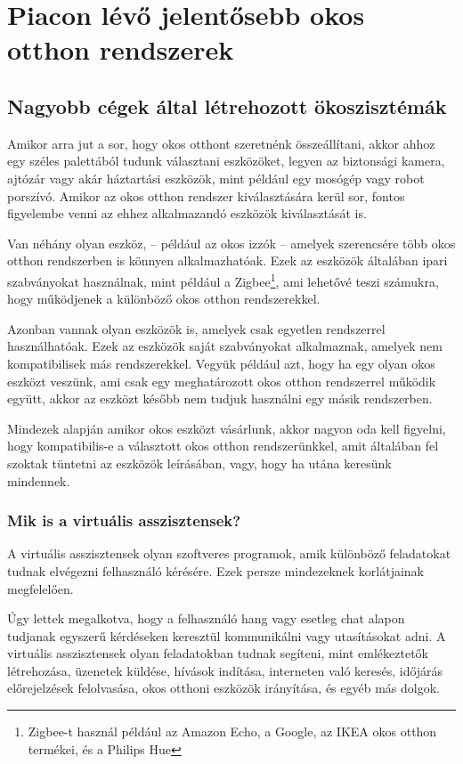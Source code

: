 \documentclass[
]{thesis-ekf}
\theoremstyle{definition}
\theoremstyle{remark}
\begin{document}
	\chapter{Piacon lévő jelentősebb okos otthon rendszerek}
	\section{Nagyobb cégek által létrehozott ökoszisztémák}
	Amikor arra jut a sor, hogy okos otthont szeretnénk összeállítani, akkor ahhoz egy széles palettából tudunk választani eszközöket, legyen az biztonsági kamera, ajtózár vagy akár háztartási eszközök, mint például egy mosógép vagy robot porszívó. Amikor az okos otthon rendszer kiválasztására kerül sor, fontos figyelembe venni az ehhez alkalmazandó eszközök kiválasztását is.
	
	Van néhány olyan eszköz, -- például az okos izzók -- amelyek szerencsére több okos otthon rendszerben is könnyen alkalmazhatóak. Ezek az eszközök általában ipari szabványokat használnak, mint például a Zigbee\footnote{Zigbee-t használ például az Amazon Echo, a Google, az IKEA okos otthon termékei, és a Philips Hue}, ami lehetővé teszi számukra, hogy működjenek a különböző okos otthon rendszerekkel. 
	
	Azonban vannak olyan eszközök is, amelyek csak egyetlen rendszerrel használhatóak. Ezek az eszközök saját szabványokat alkalmaznak, amelyek nem kompatibilisek más rendszerekkel. Vegyük például azt, hogy ha egy olyan okos eszközt veszünk, ami csak egy meghatározott okos otthon rendszerrel működik együtt, akkor az eszközt később nem tudjuk használni egy másik rendszerben.
	
	Mindezek alapján amikor okos eszközt vásárlunk, akkor nagyon oda kell figyelni, hogy kompatibilis-e a választott okos otthon rendszerünkkel, amit általában fel szoktak tüntetni az eszközök leírásában, vagy, hogy ha utána keresünk mindennek.
			
	\subsection{Mik is a virtuális asszisztensek?}
	A virtuális asszisztensek olyan szoftveres programok, amik különböző feladatokat tudnak elvégezni felhasználó kérésére. Ezek persze mindezeknek korlátjainak megfelelően.
	
	Úgy lettek megalkotva, hogy a felhasználó hang vagy esetleg chat alapon tudjanak egyszerű kérdéseken keresztül kommunikálni vagy utasításokat adni. A virtuális asszisztensek olyan feladatokban tudnak segíteni, mint emlékeztetők létrehozása, üzenetek küldése, hívások indítása, interneten való keresés, időjárás előrejelzések felolvasása, okos otthoni eszközök irányítása, és egyéb más dolgok. 
	
\end{document}
